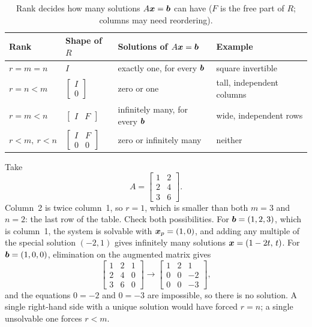 \begin{table}[ht]
  \centering
  \begin{tabular}{@{}llll@{}}
    \toprule
    Rank & Shape of $R$ & Solutions of $A\boldsymbol{x}=\boldsymbol{b}$ & Example \\
    \midrule
    $r=m=n$ & $I$ & exactly one, for every $\boldsymbol{b}$ & square invertible \\
    $r=n<m$ & $\begin{bmatrix} I\\ 0\end{bmatrix}$ & zero or one & tall, independent columns \\
    $r=m<n$ & $\begin{bmatrix} I & F\end{bmatrix}$ & infinitely many, for every $\boldsymbol{b}$ & wide, independent rows \\
    $r<m,\ r<n$ & $\begin{bmatrix} I & F\\ 0 & 0\end{bmatrix}$ & zero or infinitely many & neither \\
    \bottomrule
  \end{tabular}
  \caption{Rank decides how many solutions $A\boldsymbol{x}=\boldsymbol{b}$ can have ($F$ is the free part of $R$; columns may need reordering).}
  \label{tab:u15-cases}
\end{table}

\begin{example}\label{ex:u15-case}
Take
\[
  A=\begin{bmatrix}1&2\\2&4\\3&6\end{bmatrix}.
\]
Column~2 is twice column~1, so $r=1$, which is smaller than both $m=3$ and $n=2$: the last
row of the table. Check both possibilities. For $\boldsymbol{b}=(1,2,3)$, which is column~1, the
system is solvable with $\boldsymbol{x}_p=(1,0)$, and adding any multiple of the special solution
$(-2,1)$ gives infinitely many solutions $\boldsymbol{x}=(1-2t,\,t)$. For $\boldsymbol{b}=(1,0,0)$,
elimination on the augmented matrix gives
\[
  \left[\begin{array}{cc|c}1&2&1\\2&4&0\\3&6&0\end{array}\right]
  \longrightarrow
  \left[\begin{array}{cc|c}1&2&1\\0&0&-2\\0&0&-3\end{array}\right],
\]
and the equations $0=-2$ and $0=-3$ are impossible, so there is no solution. A single
right-hand side with a unique solution would have forced $r=n$; a single unsolvable one
forces $r<m$.
\end{example}

